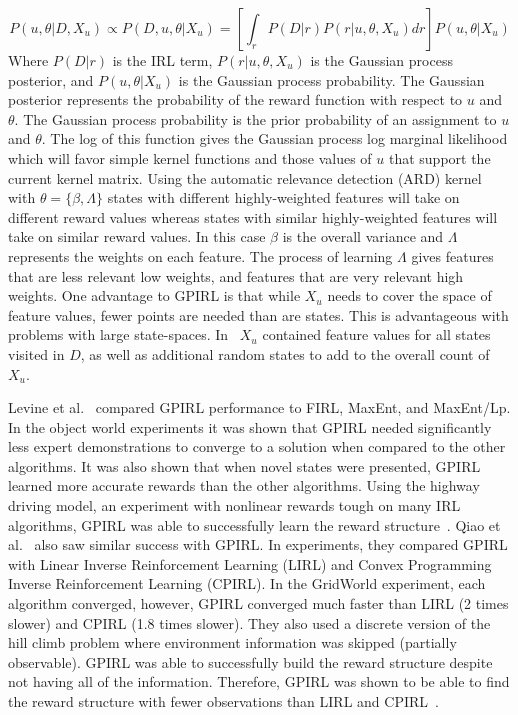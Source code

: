 \documentclass[12pt,american]{report}
\begin{document}
\begin{equation}
            \label{eq:GP_full}
           P(u,\theta|D,X_u)\propto P(D,u,\theta|X_u) = [\int_{r}P(D|r)P(r|u,\theta,X_u)dr]P(u,\theta|X_u)%
        \end{equation}
Where $P(D|r)$ is the IRL term, $P(r|u,\theta,X_u)$ is the Gaussian process posterior, and $P(u,\theta|X_u)$ is the Gaussian process probability.  The Gaussian posterior represents the probability of the reward function with respect to $u$ and $\theta$. The Gaussian process probability is the prior probability of an assignment to $u$ and $\theta$. The log of this function gives the Gaussian process log marginal likelihood which will favor simple kernel functions and those values of $u$ that support the current kernel matrix.  Using the automatic relevance detection (ARD) kernel with $\theta = \{ \beta,\Lambda \}$ states with different highly-weighted features will take on different reward values whereas states with similar highly-weighted features will take on similar reward values. In this case $\beta$ is the overall variance and $\Lambda$ represents the weights on each feature. The process of learning $\Lambda$ gives features that are less relevant low weights, and features that are very relevant high weights. One advantage to GPIRL is that while $X_u$ needs to cover the space of feature values, fewer points are needed than are states.  This is advantageous with problems with large state-spaces. In~\cite{levine2011nonlinear} $X_u$ contained feature values for all states visited in $D$, as well as additional random states to add to the overall count of $X_u$. 

Levine et al.~\cite{levine2011nonlinear} compared GPIRL performance to FIRL, MaxEnt, and MaxEnt/Lp. In the object world experiments it was shown that GPIRL needed significantly less expert demonstrations to converge to a solution when compared to the other algorithms. It was also shown that when novel states were presented, GPIRL learned more accurate rewards than the other algorithms.  Using the highway driving model, an experiment with nonlinear rewards tough on many IRL algorithms, GPIRL was able to successfully learn the reward structure~\cite{levine2011nonlinear}. Qiao et al.~\cite{qiao2011inverse} also saw similar success with GPIRL.  In experiments, they compared GPIRL with Linear Inverse Reinforcement Learning (LIRL) and Convex Programming Inverse Reinforcement Learning (CPIRL). In the GridWorld experiment, each algorithm converged, however, GPIRL converged much faster than LIRL (2 times slower) and CPIRL (1.8 times slower).  They also used a discrete version of the hill climb problem where  environment information was skipped (partially observable).  GPIRL was able to successfully build the reward structure despite not having all of the information. Therefore, GPIRL was shown to be able to find the reward structure with fewer observations than LIRL and CPIRL~\cite{qiao2011inverse}.
\end{document}
